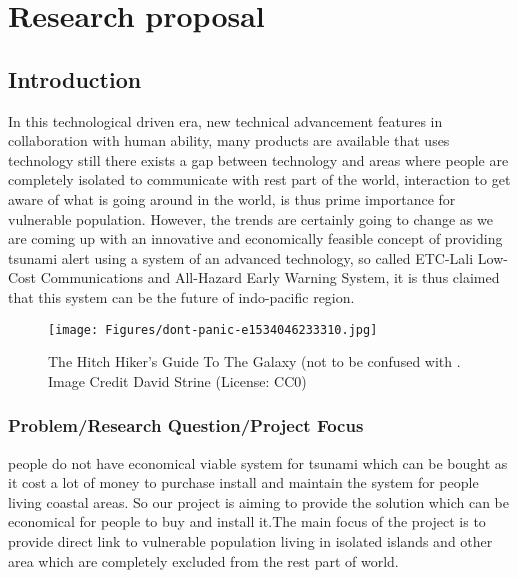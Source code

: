 
\chapter{Research proposal}\label{chapter:firstchapter} %

\label{ChapterX} %


\section{Introduction}\label{sec:firstsection}


In this technological driven era, new technical advancement features in collaboration with human ability, many products are available that uses technology  still there exists a gap between technology and  areas where people are completely isolated to communicate with rest part of the world, interaction to get aware of what is going around in the world, is thus prime importance for vulnerable population. However, the trends are certainly going to change as we are coming up with an innovative and economically feasible concept of providing tsunami alert using a system of an advanced technology, so called ETC-Lali Low-Cost Communications and All-Hazard Early Warning System, it is thus claimed that this system can be the future of indo-pacific region.

\begin{figure}
\begin{centering}
\texttt{[image: Figures/dont-panic-e1534046233310.jpg]}
\caption{The Hitch Hiker's Guide To The Galaxy (not to be confused with \cite{Reference1}. Image Credit David Strine (License: CC0)}
\label{fig:ThisFig}
\end{centering}
\end{figure}

\subsection{Problem/Research Question/Project Focus  }
people do not have economical viable system for tsunami which can be  bought  as it cost a lot of money to  purchase install and maintain the system for people living coastal areas. So our project is aiming to provide the solution which can be economical for people to buy and install it.The main focus of the project is to provide direct link to vulnerable population living in isolated islands and other area which are completely excluded from the rest part of world.\\

